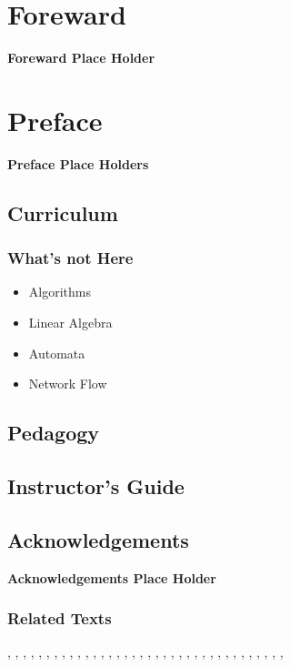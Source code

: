 \chapter*{Foreward}

\textbf{Foreward Place Holder}

\chapter*{Preface}

\textbf{Preface Place Holders}

\cite{Lehman201x}

\section*{Curriculum}

\subsection*{What's not Here}
\begin{itemize}
\item Algorithms
\item Linear Algebra
\item Automata
\item Network Flow
\end{itemize}

\section*{Pedagogy}

\section*{Instructor's Guide}

\section*{Acknowledgements}

\textbf{Acknowledgements Place Holder}

\subsection*{Related Texts}

\cite{AignerG99},
\cite{Apostol67},
\cite{BachS96},
\cite{Bender05},
\cite{BenjaminQ03},
\cite{Biggs02},
\cite{Bollobas98},
\cite{Bona07},
\cite{Boolos74},
\cite{CormenLRS09},
\cite{Cupillari12},
\cite{Diestel00},
\cite{Even73},
\cite{Fellerv168},
\cite{Flajolet09},
\cite{Gersting03},
\cite{GoodaireP01},
\cite{GrahamKP94}, 
\cite{GrinsteadS97},
\cite{Gusfield89},
\cite{HaggardSW05},
\cite{HartsfieldR03},
\cite{LawlerC99},
\cite{LovaszPV03},
\cite{Machtey78},
\cite{Matiyasevich93},
\cite{Mitzenmacher05},
\cite{MotwaniR95},
\cite{Polya57},
\cite{Rosen02},
\cite{Ross02},
\cite{Schneierman12},
\cite{Shoup05},
\cite{Strang86},
\cite{Velleman94},
\cite{Wilf90},
\cite{Williams01}

